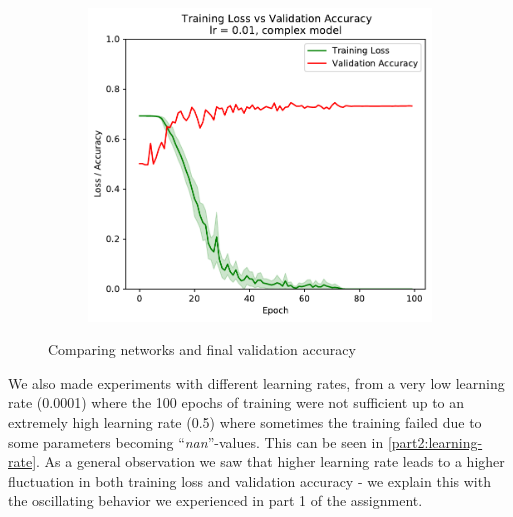 \documentclass[sigconf,nonacm]{acmart}
\begin{document}
\begin{figure}[ht]
\begin{subfigure}[c]{0.3\columnwidth}
\end{subfigure}
\begin{subfigure}[c]{0.3\columnwidth}
\includegraphics[width=\textwidth]{plot_complex_0_01.pdf}
\end{subfigure}
\caption{Comparing networks and final validation accuracy}
\label{part2:network}
\end{figure}
  
We also made experiments with different learning rates,
from a very low learning rate (0.0001) where the
100 epochs of training were not sufficient up to an
extremely high learning rate (0.5) where sometimes the
training failed due to some parameters becoming
``\emph{nan}''-values. This can be seen in
\ref{part2:learning-rate}.
As a general observation we saw that higher learning
rate leads to a higher fluctuation in both training
loss and validation accuracy - we explain this
with the oscillating behavior we experienced in
part 1 of the assignment.
\end{document}
